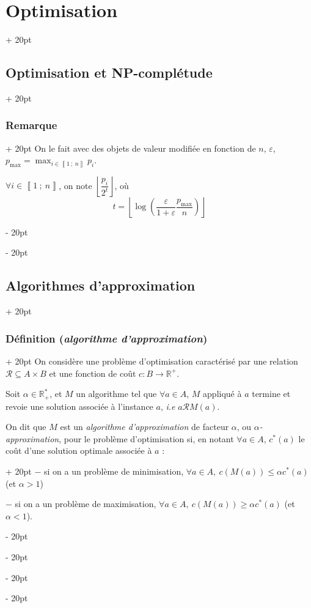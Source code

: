 \documentclass[a4paper, 12pt, twoside]{article}
\newcommand{\R}{\mathbb{R}} %
\newcommand{\nset}[2]{\left\llbracket #1\ ;\ #2 \right\rrbracket}
\newcommand{\lr}[1]{\left( #1 \right)}
\newcommand{\floor}[1]{\left\lfloor #1 \right\rfloor}
\renewcommand{\le}{\leqslant}
\renewcommand{\ge}{\geqslant}
\newcommand{\ind}[1][20pt]{\advance\leftskip + #1}
\newcommand{\deind}[1][20pt]{\advance\leftskip - #1}
\newenvironment{indt}[2][20pt]{#2 \par \ind[#1]}{\par \deind} %
\newcommand{\1}{\mathbbm 1}
\begin{document}
\begin{indt}{\section{Optimisation}}
\begin{indt}{\subsection{Optimisation et \textbf{NP}-complétude}}
\begin{indt}{\subsubsection{Remarque}}
                On le fait avec des objets de valeur modifiée en fonction de $n$, $\varepsilon$, $\displaystyle p_{\max} = \max_{i \in \nset 1 n} p_i$.

                $\displaystyle \forall i \in \nset 1 n$, on note $\floor{\dfrac{p_i}{2^t}}$, où
                \[
                    t = \floor{\log\!\lr{\dfrac{\varepsilon}{1 + \varepsilon} \dfrac{p_{\max}}{n}}}
                \]
            \end{indt}
        \end{indt}

        \vspace{12pt}
        
        \begin{indt}{\subsection{Algorithmes d'approximation}}
            \begin{indt}{\subsubsection{Définition (\textit{algorithme d'approximation})}}
                On considère une problème d'optimisation caractérisé par une relation $\mathcal R \subseteq A \times B$ et une fonction de coût $c : B \longrightarrow \R^+$.

                Soit $\alpha \in \R_+^*$, et $M$ un algorithme tel que $\forall a \in A$, $M$ appliqué à $a$ termine et revoie une solution associée à l'instance $a$, \textit{i.e} $a \mathcal R M(a)$.

                On dit que $M$ est un \emph{algorithme d'approximation} de facteur $\alpha$, ou \emph{$\alpha$-approximation}, pour le problème d'optimisation si, en notant $\forall a \in A$, $c^*(a)$ le coût d'une solution optimale associée à $a$ :
                \begin{indt}{}
                    $-$ si on a un problème de minimisation, $\forall a \in A,\ c(M(a)) \le \alpha c^*(a)$ (et $\alpha > 1$)
                    
                    $-$ si on a un problème de maximisation, $\forall a \in A,\ c(M(a)) \ge \alpha c^*(a)$ (et $\alpha < 1$).
                \end{indt}
            \end{indt}

            \vspace{12pt}
            

\end{indt}
\end{indt}
\end{document}
